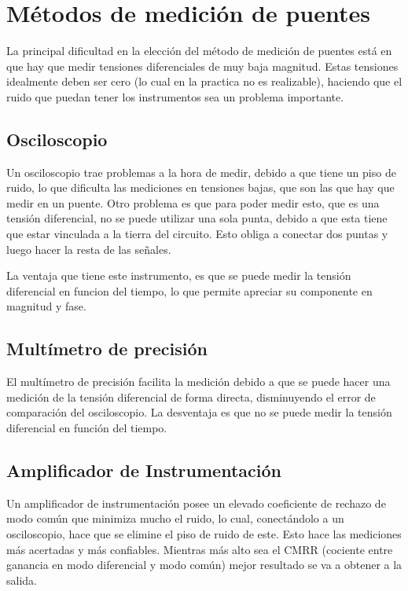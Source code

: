 \chapter{Métodos de medición de puentes}

La principal dificultad en la elección del método de medición de puentes 
está en que hay que medir tensiones diferenciales de muy baja magnitud. 
Estas tensiones idealmente deben ser cero (lo cual en la practica no es 
realizable), haciendo que el ruido que puedan tener los instrumentos sea 
un problema importante. 

\section{Osciloscopio}

Un osciloscopio trae problemas a la hora de medir, debido a que tiene un 
piso de ruido, lo que dificulta las mediciones en tensiones bajas, que son 
las que hay que medir en un puente. Otro problema es que para poder medir 
esto, que es una tensión diferencial, no se puede utilizar una sola punta, 
debido a que esta tiene que estar vinculada a la tierra del circuito. Esto 
obliga a conectar dos puntas y luego hacer la resta de las señales.

La ventaja que tiene este instrumento, es que se puede medir la tensión 
diferencial en funcion del tiempo, lo que permite apreciar su componente 
en magnitud y fase.

\section{Multímetro de precisión}

El multímetro de precisión facilita la medición debido a que se puede 
hacer una medición de la tensión diferencial de forma directa, disminuyendo 
el error de comparación del osciloscopio. La desventaja es que no se puede medir 
la tensión diferencial en función del tiempo.

\section{Amplificador de Instrumentación}

Un amplificador de instrumentación posee un elevado coeficiente de rechazo 
de modo común que minimiza mucho el ruido, lo cual, conectándolo a un 
osciloscopio, hace que se elimine el piso de ruido de este. Esto hace las 
mediciones más acertadas y más confiables. Mientras más alto sea el CMRR 
(cociente entre ganancia en modo diferencial y modo común) mejor resultado 
se va a obtener a la salida.